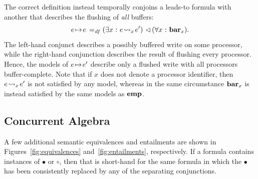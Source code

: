 \documentclass[11pt]{report}         %
\begin{document}
The correct definition instead temporally conjoins a leads-to formula with another that describes the flushing of \emph{all} buffers: \[ e \!\mapsto\! e \operatorname{\;=_{\mathit{df}}\;} (\exists x \operatorname{\,:\,} e \!\leadsto_{x}\! e') \operatorname{\,\vartriangleleft\,} (\forall x \operatorname{\,:\,} \mathbf{bar}_{x}).\] The left-hand conjunct describes a possibly buffered write on some processor, while the right-hand conjunction describes the result of flushing every processor. Hence, the models of $e \!\mapsto\! e'$ describe only a flushed write with all processors buffer-complete. Note that if $x$ does not denote a processor identifier, then $e \!\leadsto_{x}\! e'$ is not satisfied by any model, whereas in the same circumstance $\mathbf{bar}_{x}$ is instead satisfied by the same models as $\mathbf{emp}$. 



\subsection{Concurrent Algebra}
\label{sec:algebra}

A few additional semantic equivalences and entailments are shown in Figures~\ref{fig:equivalences} and~\ref{fig:entailments}, respectively. If a formula contains instances of $\bullet$ or $\circ$, then that is short-hand for the same formula in which the $\bullet$ has been consistently replaced by any of the separating conjunctions. 
\end{document}
